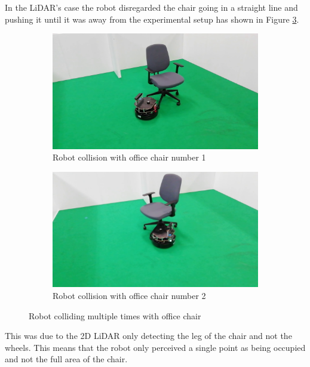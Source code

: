 In the \ac{LiDAR}'s case  the robot disregarded the chair going in a straight line and pushing it until it was away from the experimental setup has shown in Figure \ref{fig:wchairLF}.

\begin{figure}[ht!]
  \centering
  \begin{subfigure}[b]{0.49\linewidth}
    \includegraphics[width=\linewidth]{imgs/chapter5/wchairLF.png}
     \caption{Robot collision with office chair number 1}
     \label{fig::wchairLF1}
  \end{subfigure}
  \begin{subfigure}[b]{0.49\linewidth}
    \includegraphics[width=\linewidth]{imgs/chapter5/wchairLF2.png}
    \caption{Robot collision with office chair number 2}
    \label{fig::wchairLF2}
  \end{subfigure}
  \caption{Robot colliding multiple times with office chair}
  \label{fig:wchairLF}
\end{figure}


This was due to the 2D \ac{LiDAR} only detecting the leg of the chair and not the wheels. This means that the robot only perceived a single point as being occupied and not the full area of the chair. 

